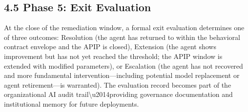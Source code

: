 \subsection{4.5  Phase 5: Exit Evaluation}

At the close of the remediation window, a formal exit evaluation determines one of three outcomes: Resolution (the agent has returned to within the behavioral contract envelope and the APIP is closed), Extension (the agent shows improvement but has not yet reached the threshold; the APIP window is extended with modified parameters), or Escalation (the agent has not recovered and more fundamental intervention---including potential model replacement or agent retirement---is warranted). The evaluation record becomes part of the organizational AI audit trail\textbackslash{}u2014providing governance documentation and institutional memory for future deployments.

